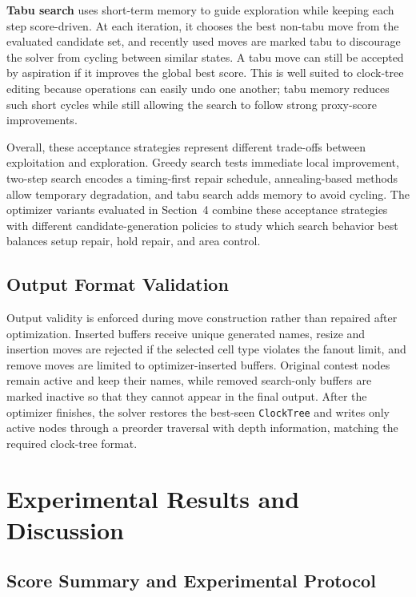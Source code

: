 \documentclass{article}
\begin{document}
\textbf{Tabu search}\cite{glover1989tabu} uses short-term memory to guide exploration while keeping each step score-driven. At each iteration, it chooses the best non-tabu move from the evaluated candidate set, and recently used moves are marked tabu to discourage the solver from cycling between similar states. A tabu move can still be accepted by aspiration if it improves the global best score. This is well suited to clock-tree editing because operations can easily undo one another; tabu memory reduces such short cycles while still allowing the search to follow strong proxy-score improvements.

Overall, these acceptance strategies represent different trade-offs between exploitation and exploration. Greedy search tests immediate local improvement, two-step search encodes a timing-first repair schedule, annealing-based methods allow temporary degradation, and tabu search adds memory to avoid cycling. The optimizer variants evaluated in Section~4 combine these acceptance strategies with different candidate-generation policies to study which search behavior best balances setup repair, hold repair, and area control.

\subsection{Output Format Validation}

Output validity is enforced during move construction rather than repaired after optimization. Inserted buffers receive unique generated names, resize and insertion moves are rejected if the selected cell type violates the fanout limit, and remove moves are limited to optimizer-inserted buffers. Original contest nodes remain active and keep their names, while removed search-only buffers are marked inactive so that they cannot appear in the final output.
After the optimizer finishes, the solver restores the best-seen \texttt{ClockTree} and writes only active nodes through a preorder traversal with depth information, matching the required clock-tree format.

\section{Experimental Results and Discussion}
\label{sec:experiments}
\subsection{Score Summary and Experimental Protocol}
\end{document}
